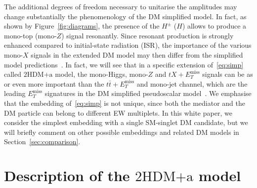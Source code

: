\documentclass[a4paper, 11pt,notoc]{article}
\newcommand{\MET}{\ensuremath{E_T^\mathrm{miss}}\xspace}
\newcommand{\hdma}{\ensuremath{\textrm{2HDM+a}}\xspace}
\begin{document}
The additional degrees of freedom necessary to unitarise the amplitudes may change substantially the phenomenology of the DM simplified model. In fact, as shown by Figure~\ref{fig:diagrams}, the presence of the $H^\pm$ ($H$) allows to produce a mono-top (mono-$Z$)  signal resonantly. Since resonant production is strongly enhanced compared to initial-state radiation (ISR), the  importance of the various mono-$X$ signals in the extended DM model may then differ from the simplified model predictions~\cite{Goncalves:2016iyg,Bauer:2017ota,Pani:2017qyd}. In fact, we will see that in a specific extension of~\eqref{eq:simp}  called \hdma model, the mono-Higgs, mono-$Z$ and $t X + \MET$ signals can be as or even more important than the $t \bar t + \MET$ and mono-jet channel, which are  the leading $\MET$ signatures in the DM simplified pseudoscalar model~\cite{Haisch:2012kf,Fox:2012ru,Buckley:2014fba,Harris:2014hga,Haisch:2015ioa,Mattelaer:2015haa,Backovic:2015soa,Neubert:2015fka,Arina:2016cqj}. We emphasise that the embedding of~\eqref{eq:simp} is not unique, since  both the mediator and the DM particle can belong to different EW multiplets. In this white paper, we consider the simplest embedding with a single SM-singlet DM candidate,  but we will briefly comment on other possible embeddings and related DM models in Section~\ref{sec:comparison}.  


\section{Description of the \hdma model}
\label{sec:modeldescription}
\end{document}
